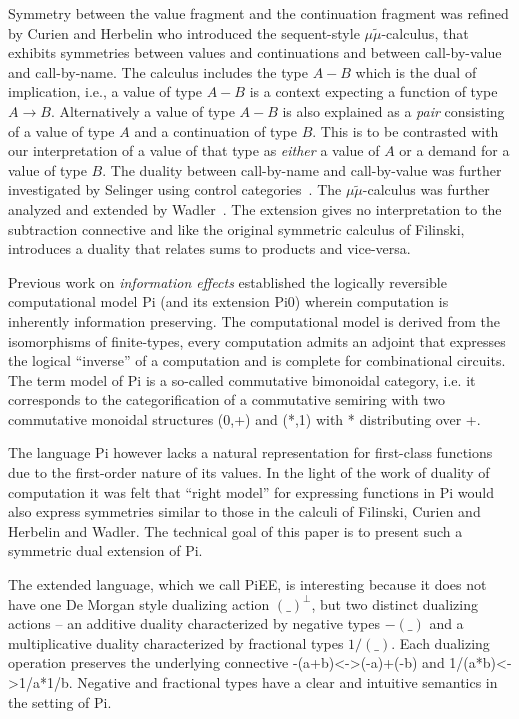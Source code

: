 \documentclass[preprint]{sigplanconf}
\begin{document}
Symmetry between the value fragment and the continuation fragment was
refined by Curien and Herbelin \cite{Curien:2000} who introduced the
sequent-style $\mu\tilde{\mu}$-calculus, that exhibits symmetries
between values and continuations and between call-by-value and
call-by-name. The calculus includes the type $A-B$ which is the dual
of implication, i.e., a value of type $A-B$ is a context expecting a
function of type $A \rightarrow B$. Alternatively a value of type
$A-B$ is also explained as a \emph{pair} consisting of a value of type
$A$ and a continuation of type $B$. This is to be contrasted with our
interpretation of a value of that type as \emph{either} a value of $A$
or a demand for a value of type $B$. The duality between call-by-name
and call-by-value was further investigated by Selinger using control
categories~\cite{Selinger:2001:CCD:966910.966911}. The
$\mu\tilde{\mu}$-calculus was further analyzed and extended by
Wadler~\cite{Wadler:2003,DBLP:conf/rta/Wadler05}. The extension gives
no interpretation to the subtraction connective and like the original
symmetric calculus of Filinski, introduces a duality that relates sums
to products and vice-versa.

Previous work on \emph{information effects} established the logically
reversible computational model {{Pi}} (and its extension {{Pi0}})
wherein computation is inherently information preserving. The
computational model is derived from the isomorphisms of finite-types,
every computation admits an adjoint that expresses the logical
``inverse'' of a computation and is complete for combinational
circuits. The term model of {{Pi}} is a so-called commutative
bimonoidal category, i.e. it corresponds to the categorification of a
commutative semiring with two commutative monoidal structures
{{(0,+)}} and {{(*,1)}} with {{*}} distributing over {{+}}. 

The language {{Pi}} however lacks a natural representation for
first-class functions due to the first-order nature of its values. In
the light of the work of duality of computation it was felt that
``right model'' for expressing functions in {{Pi}} would also express
symmetries similar to those in the calculi of Filinski, Curien and
Herbelin and Wadler. The technical goal of this paper is to present
such a symmetric dual extension of {{Pi}}.

The extended language, which we call {{PiEE}}, is interesting because
it does not have one De Morgan style dualizing action $(\_)^\bot$, but
two distinct dualizing actions -- an additive duality characterized by
negative types $-(\_)$ and a multiplicative duality characterized by
fractional types $1/(\_)$. Each dualizing operation preserves the
underlying connective {{-(a+b)<->(-a)+(-b)}} and
{{1/(a*b)<->1/a*1/b}}. Negative and fractional types have a clear and
intuitive semantics in the setting of {{Pi}}.  
\end{document}
